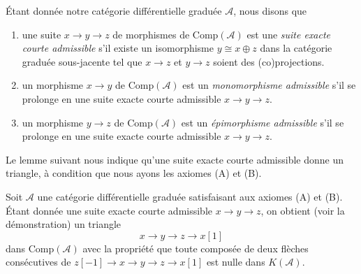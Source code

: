 \noindent
Étant donnée notre catégorie différentielle graduée $\mathcal{A}$, nous disons que
\begin{enumerate}
\item une suite $x \to y \to z$ de morphismes de $\text{Comp}(\mathcal{A})$
est une {\it suite exacte courte admissible} s'il existe un
isomorphisme $y \cong x \oplus z$ dans la catégorie graduée sous-jacente tel
que $x \to z$ et $y \to z$ soient des (co)projections.
\item un morphisme $x\to y$ de $\text{Comp}(\mathcal{A})$ est un
{\it monomorphisme admissible} s'il se prolonge en
une suite exacte courte admissible $x\to y\to z$.
\item un morphisme $y\to z$ de $\text{Comp}(\mathcal{A})$ est un
{\it épimorphisme admissible} s'il se prolonge en
une suite exacte courte admissible $x\to y\to z$.
\end{enumerate}
Le lemme suivant nous indique qu'une suite exacte courte admissible donne un
triangle, à condition que nous ayons les axiomes (A) et (B).

\begin{lemma}
\label{lemma-get-triangle}
Soit $\mathcal{A}$ une catégorie différentielle graduée satisfaisant aux
axiomes (A) et (B). Étant donnée une suite exacte courte admissible $x \to
y \to z$, on obtient (voir la démonstration) un triangle
$$
x \to y \to z \to x[1]
$$
dans $\text{Comp}(\mathcal{A})$ avec la propriété que toute composée de deux flèches
consécutives de $z[-1] \to x \to y \to z \to x[1]$ est nulle dans $K(\mathcal{A})$.
\end{lemma}

